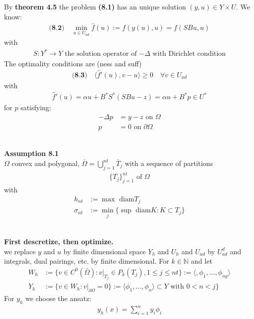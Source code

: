 By \textbf{theorem 4.5} the problem \textbf{(8.1)} has an unique solution $(y, u) \in Y \times U$. We know:
\begin{align*} \textbf{(8.2)} \quad
	\min_{u \in U_{ad}} \hat{f}(u) := f(y(u), u) = f(SBu, u) 
\end{align*}
with 
\begin{align*}
	S: Y^* \rightarrow Y \text{ the solution operator of $-\Delta$ with Dirichlet condition}
\end{align*}
The optimality conditions are (ness and suff)
\begin{align*}
\textbf{(8.3)} \quad
	\langle \hat{f}'(u), v - u \rangle \geq 0 \quad \forall v \in U_{ad}
\end{align*}
with 
\begin{align*}
	\hat{f}'(u) = \alpha u + B^* S^* (S B u - z) = \alpha u + B^* p \in U^*
\end{align*}
for $p$ satisfying:
\begin{align*}
	- \Delta p &= y - z \text{ on } \Omega\\
	p &= 0 \text{ on } \partial \Omega
\end{align*}

\quad\\
\textbf{Assumption 8.1}\\
$\Omega$ convex and polygonal, $\bar{\Omega} = \bigcup_{j = 1}^{nt} \bar{T}_j $ with a sequence of partitions
\begin{align*}
	\{T_j\}_{j =1}^{nt} \text{ of $\Omega$}
\end{align*}
with
\begin{align*}
	h_{nt}&:= \max \text{ diam} T_j\\
	\sigma_{nt}&:= \min_j \{ \sup \text{ diam} K : K \subset T_j\}
\end{align*}

\qquad\\
\textbf{First descretize, then optimize.}\\
we replace $y$ and $u$ by finite dimensional space $Y_h$ and $U_h$ and $U_{ad}$ by $U_{ad}^d$ and integrals, dual pairings, etc. by finite dimensional. For $k \in \mathbb{N}$ and let 
\begin{align*}
	W_h &:= \{ v \in C^0(\bar{\Omega}): v|_{T_j} \in P_k(T_j), 1 \le j \le nt\} := \langle, \phi_1, \dots, \phi_{ng}\rangle\\
	Y_h &:= \{ v \in W_h: v|_{\partial\Omega} = 0 \} := \langle \phi_1, \dots, \phi_n \rangle \subset Y \text{ with } 0 < n < j\}
\end{align*}
For $y_h$ we choose the ansatz:
\begin{align*}
	y_h(x) = \sum_{i = 1}^n y_i \phi_i
\end{align*}

